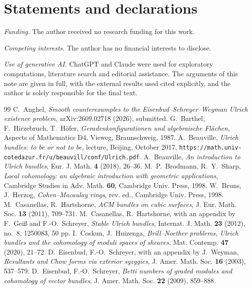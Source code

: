 \documentclass[11pt]{amsart}
\theoremstyle{remark}
\theoremstyle{definition}
\begin{document}
\section*{Statements and declarations}

\noindent\emph{Funding.} The author received no research funding for this work.

\noindent\emph{Competing interests.} The author has no financial interests to disclose.

\noindent\emph{Use of generative AI.} ChatGPT and Claude were used for exploratory computations, literature search and editorial assistance. The arguments of this note are given in full, with the external results used cited explicitly, and the author is solely responsible for the final text.


\begin{thebibliography}{99}
 C.~Anghel, \emph{Smooth counterexamples to the Eisenbud--Schreyer--Weyman Ulrich existence problem}, arXiv:2609.02718 (2026), submitted.
 G.~Barthel, F.~Hirzebruch, T.~H\"ofer, \emph{Geradenkonfigurationen und algebraische Fl\"achen}, Aspects of Mathematics D4, Vieweg, Braunschweig, 1987.
 A.~Beauville, \emph{Ulrich bundles: to be or not to be}, lecture, Beijing, October 2017, \texttt{https://math.univ-cotedazur.fr/u/beauvill/conf/Ulrich.pdf}.
 A.~Beauville, \emph{An introduction to Ulrich bundles}, Eur. J. Math. \textbf{4} (2018), 26--36.
 M.~P.~Brodmann, R.~Y.~Sharp, \emph{Local cohomology: an algebraic introduction with geometric applications}, Cambridge Studies in Adv. Math. \textbf{60}, Cambridge Univ. Press, 1998.
 W.~Bruns, J.~Herzog, \emph{Cohen--Macaulay rings}, rev. ed., Cambridge Univ. Press, 1998.
 M.~Casanellas, R.~Hartshorne, \emph{ACM bundles on cubic surfaces}, J. Eur. Math. Soc. \textbf{13} (2011), 709--731.
 M.~Casanellas, R.~Hartshorne, with an appendix by F.~Gei\ss{} and F.-O.~Schreyer, \emph{Stable Ulrich bundles}, Internat. J. Math. \textbf{23} (2012), no.~8, 1250083, 50 pp.
 I.~Coskun, J.~Huizenga, \emph{Brill--Noether problems, Ulrich bundles and the cohomology of moduli spaces of sheaves}, Mat. Contemp. \textbf{47} (2020), 21--72.
 D.~Eisenbud, F.-O.~Schreyer, with an appendix by J.~Weyman, \emph{Resultants and Chow forms via exterior syzygies}, J. Amer. Math. Soc. \textbf{16} (2003), 537--579.
 D.~Eisenbud, F.-O.~Schreyer, \emph{Betti numbers of graded modules and cohomology of vector bundles}, J. Amer. Math. Soc. \textbf{22} (2009), 859--888.

\end{thebibliography}
\end{document}
